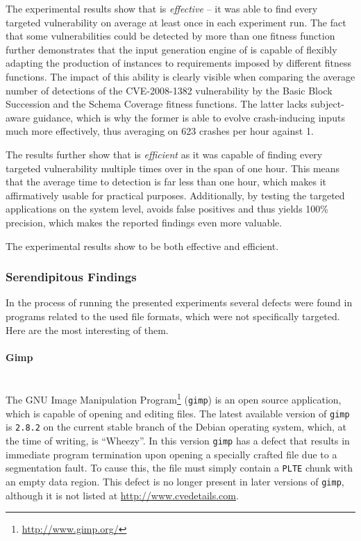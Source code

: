 The experimental results show that \xmlmate is \emph{effective} -- it was able to find every targeted
vulnerability on average at least once in each experiment run. The fact that some vulnerabilities could be detected by more than
one fitness function further demonstrates that the input generation engine of \xmlmate is capable of flexibly
adapting the production of instances to requirements imposed by different fitness functions. 
The impact of this ability is clearly visible when comparing the average number of detections of the
{\small CVE-2008-1382} vulnerability by the Basic Block Succession and the Schema Coverage fitness
functions. The latter lacks subject-aware guidance, which is why the former is able to evolve
crash-inducing inputs much more effectively, thus averaging on 623 crashes per hour against 1.

The results further show that \xmlmate is \emph{efficient} as it was capable of finding every targeted
vulnerability multiple times over in the span of one hour. This means that the average time to detection is
far less than one hour, which makes it affirmatively usable for practical purposes. Additionally, by 
testing the targeted applications on the system level, \xmlmate avoids false positives and thus yields
100\% precision, which makes the reported findings even more valuable.

\begin{mdframed}
\centering
The experimental results show \xmlmate to be both effective and efficient. 
\end{mdframed}

\subsubsection{Serendipitous Findings}
In the process of running the presented experiments several defects were found in programs
related to the used file formats, which were not specifically targeted. Here are the most interesting of them.
\paragraph{Gimp} ~\\
The GNU Image Manipulation Program\footnote{\url{http://www.gimp.org/}} (\texttt{gimp}) is an open source
application, which is capable of opening and editing \png files. The latest available version of \texttt{gimp}
is \texttt{2.8.2} on the current stable branch of the Debian operating system, which, at the time of writing,
is ``Wheezy''. In this version \texttt{gimp} has a defect that results in immediate program termination upon
opening a specially crafted \png file due to a segmentation fault. To cause this, the \png file must
simply contain a \texttt{PLTE} chunk with an empty data region. This defect is no longer present in later
versions of \texttt{gimp}, although it is not listed at \url{http://www.cvedetails.com}.
